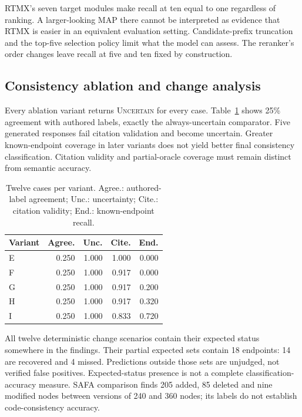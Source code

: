\documentclass[conference,a4paper]{IEEEtran}
\newcommand{\uncertain}{\textsc{Uncertain}}
\begin{document}
RTMX's seven target modules make recall at ten equal to one regardless of ranking. A larger-looking MAP there cannot be interpreted as evidence that RTMX is easier in an equivalent evaluation setting. Candidate-prefix truncation and the top-five selection policy limit what the model can assess. The reranker's order changes leave recall at five and ten fixed by construction.

\subsection{Consistency ablation and change analysis}
Every ablation variant returns \uncertain{} for every case. Table~\ref{tab:abl} shows 25\% agreement with authored labels, exactly the always-uncertain comparator. Five generated responses fail citation validation and become uncertain. Greater known-endpoint coverage in later variants does not yield better final consistency classification. Citation validity and partial-oracle coverage must remain distinct from semantic accuracy.
\begin{table}[!t]
\centering\footnotesize
\caption{Twelve cases per variant. Agree.: authored-label agreement; Unc.: uncertainty; Cite.: citation validity; End.: known-endpoint recall.}\label{tab:abl}
\begin{tabular}{lrrrr}\toprule
Variant & Agree. & Unc. & Cite. & End. \\\midrule
E & 0.250 & 1.000 & 1.000 & 0.000 \\
F & 0.250 & 1.000 & 0.917 & 0.000 \\
G & 0.250 & 1.000 & 0.917 & 0.200 \\
H & 0.250 & 1.000 & 0.917 & 0.320 \\
I & 0.250 & 1.000 & 0.833 & 0.720 \\
\bottomrule\end{tabular}
\end{table}

All twelve deterministic change scenarios contain their expected status somewhere in the findings. Their partial expected sets contain 18 endpoints: 14 are recovered and 4 missed. Predictions outside those sets are unjudged, not verified false positives. Expected-status presence is not a complete classification-accuracy measure. SAFA comparison finds 205 added, 85 deleted and nine modified nodes between versions of 240 and 360 nodes; its labels do not establish code-consistency accuracy.
\end{document}
